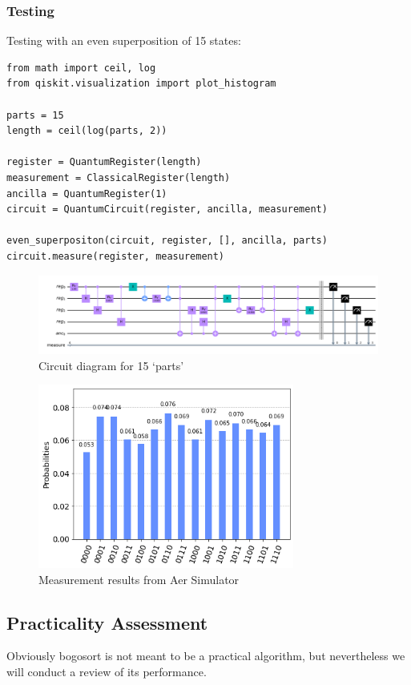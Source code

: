 \documentclass[12pt]{article}
\begin{document}
\subsubsection{Testing}
Testing with an even superposition of 15 states:

\begin{verbatim}
from math import ceil, log
from qiskit.visualization import plot_histogram

parts = 15
length = ceil(log(parts, 2))

register = QuantumRegister(length)
measurement = ClassicalRegister(length)
ancilla = QuantumRegister(1)
circuit = QuantumCircuit(register, ancilla, measurement)

even_superpositon(circuit, register, [], ancilla, parts)
circuit.measure(register, measurement)
\end{verbatim}

\begin{figure}[h]
    \centering
    \includegraphics[width=\textwidth]{images/example_circuit.png}
    \caption{Circuit diagram for 15 `parts'}
    \label{fig:circ_diagram}
\end{figure}
\begin{figure}[H]
    \centering
    \includegraphics[width=0.75\textwidth]{images/example_measurement.png}
    \caption{Measurement results from Aer Simulator}
    \label{fig:measures}
\end{figure}

\subsection{Practicality Assessment}
Obviously bogosort is not meant to be a practical algorithm, but nevertheless we will conduct a review of its performance.
\end{document}
